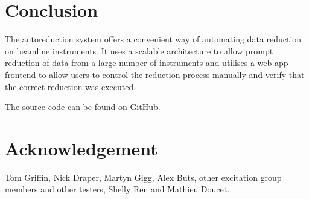 \documentclass[twocolumn]{article}
\begin{document}
\section{Conclusion}\label{conclusion}

The autoreduction system offers a convenient way of automating data reduction
on beamline instruments. It uses a scalable architecture to allow prompt
reduction of data from a large number of instruments and utilises a web app
frontend to allow users to control the reduction process manually and verify
that the correct reduction was executed.

The source code can be found on GitHub\cite{source}.

\section{Acknowledgement}\label{Acknowledgement}

Tom Griffin, Nick Draper, Martyn Gigg, Alex Buts, other excitation group members and other testers, Shelly Ren and Mathieu Doucet.
\end{document}
